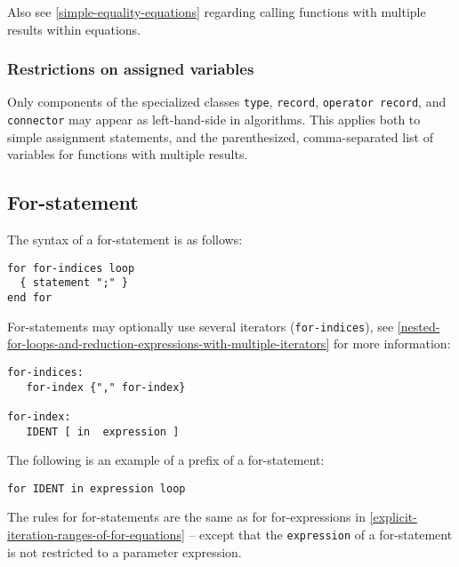 \begin{nonnormative}
Also see \cref{simple-equality-equations} regarding calling functions with
multiple results within equations.
\end{nonnormative}

\subsubsection{Restrictions on assigned variables}\label{restrictions-on-assigned-variables}

Only components of the specialized classes \lstinline!type!, \lstinline!record!, \lstinline!operator record!, and \lstinline!connector! may appear as left-hand-side in algorithms.
This applies both to simple assignment statements, and the parenthesized, comma-separated list of variables for functions with multiple results.

\subsection{For-statement}\label{for-statement}

The syntax of a for-statement is as follows:
\begin{lstlisting}[language=grammar]
for for-indices loop
  { statement ";" }
end for
\end{lstlisting}
For-statements may optionally use several iterators (\lstinline!for-indices!), see
\cref{nested-for-loops-and-reduction-expressions-with-multiple-iterators} for more information:
\begin{lstlisting}[language=grammar]
for-indices:
   for-index {"," for-index}

for-index:
   IDENT [ in  expression ]
\end{lstlisting}
The following is an example of a prefix of a for-statement:
\begin{lstlisting}[language=modelica]
for IDENT in expression loop
\end{lstlisting}
The rules for for-statements are the same as for for-expressions in \cref{explicit-iteration-ranges-of-for-equations} -- except that the \lstinline!expression! of a for-statement is not restricted to a parameter expression.

